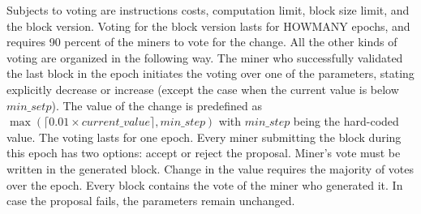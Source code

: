 Subjects to voting are instructions costs, computation limit, block size limit,
and the block version. Voting for the block version lasts for {\color{red}
HOWMANY} epochs, and requires 90 percent of the miners to vote for the change.
All the other kinds of voting are organized in the following way. The miner who
successfully validated the last block in the epoch initiates the voting over one
of the parameters, stating explicitly decrease or increase (except the case when
the current value is below $min\_setp$). The value of the change is predefined
as $\max(\lceil0.01\times current\_value\rceil, min\_step)$ with $min\_step$
being the hard-coded value.  The voting lasts for one epoch. Every miner
submitting the block during this epoch has two options: accept or reject the
proposal. Miner's vote must be written in the generated block. Change in the
value requires the majority of votes over the epoch. Every block contains the
vote of the miner who generated it. In case the proposal fails, the parameters
remain unchanged.

